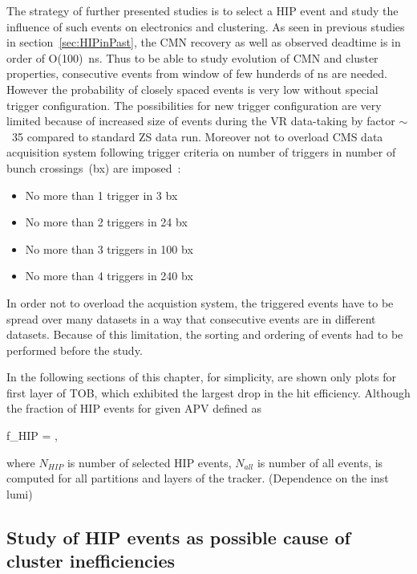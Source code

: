 The strategy of further presented studies is to select a HIP event and study the influence of such events on electronics and clustering. As seen in previous studies in section~\ref{sec:HIPinPast}, the CMN recovery as well as observed deadtime is in order of O(100)~ns. Thus to be able to study evolution of CMN and cluster properties, consecutive events from window of few hunderds of ns are needed. However the probability of closely spaced events is very low without special trigger configuration. The possibilities for new trigger configuration are very limited because of increased size of events during the VR data-taking by factor $\sim$~35 compared to standard ZS data run. Moreover not to overload CMS data acquisition system following trigger criteria on number of triggers in number of bunch crossings~(bx) are  imposed~\cite{website:VRtrigger}:

\begin{itemize}
\item{No more than 1 trigger in 3 bx}
\item{No more than 2 triggers in 24 bx}
\item{No more than 3 triggers in 100 bx}
\item{No more than 4 triggers in 240 bx}
\end{itemize}

In order not to overload the acquistion system, the triggered events have to be spread over many datasets in a way that consecutive events are in different datasets. Because of this limitation, the sorting and ordering of events had to be performed before the study.

In the following sections of this chapter, for simplicity, are shown only plots for first layer of TOB, which exhibited the largest drop in the hit efficiency. Although the fraction of HIP events for given APV defined as


{
f_{HIP} = ,
}

where $N_{HIP}$ is number of selected HIP events, $N_{all}$ is number of all events, is computed for all partitions and layers of the tracker. (Dependence on the inst lumi)


\subsection{Study of HIP events as possible cause of cluster inefficiencies}

